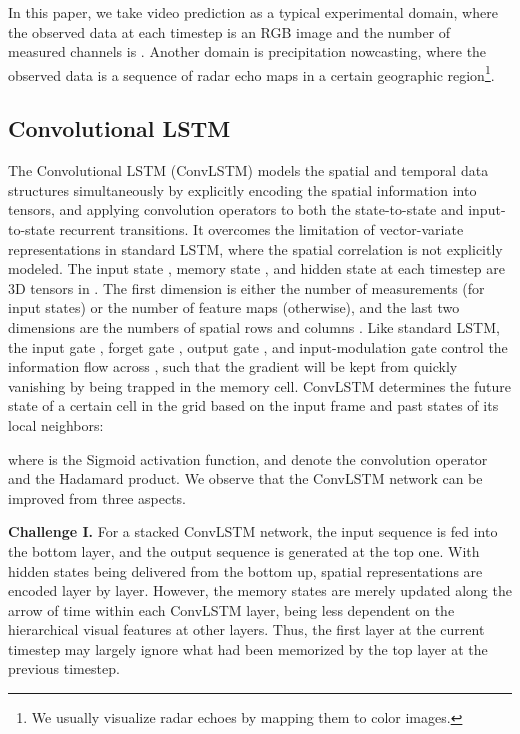 \documentclass[10pt,journal,compsoc]{IEEEtran}
\newcommand{\myparagraph}[1]{\vspace{5pt} \noindent \textbf{#1.}}
\begin{document}
In this paper, we take video prediction as a typical experimental domain, where the observed data at each timestep is an RGB image and the number of measured channels is .
Another domain is precipitation nowcasting, where the observed data is a sequence of radar echo maps in a certain geographic region\footnote{
We usually visualize radar echoes by mapping them to color images.}. 

\subsection{Convolutional LSTM}

The Convolutional LSTM (ConvLSTM) \cite{shi2015convolutional} models the spatial and temporal data structures simultaneously by explicitly encoding the spatial information into tensors, and applying convolution operators to both the state-to-state and input-to-state recurrent transitions.
It overcomes the limitation of vector-variate representations in standard LSTM, where the spatial correlation is not explicitly modeled. 
The input state , memory state , and hidden state  at each timestep are 3D tensors in . The first dimension is either the number of measurements (for input states) or the number of feature maps (otherwise), and the last two dimensions are the numbers of spatial rows  and columns . 
Like standard LSTM, the input gate , forget gate , output gate , and input-modulation gate  control the information flow across , such that the gradient will be kept from quickly vanishing by being trapped in the memory cell.
ConvLSTM determines the future state of a certain cell in the  grid based on the input frame and past states of its local neighbors:

where  is the Sigmoid activation function,  and  denote the convolution operator and the Hadamard product. 
We observe that the ConvLSTM network can be improved from three aspects.

\myparagraph{Challenge I}
For a stacked ConvLSTM network, the input sequence  is fed into the bottom layer, and the output sequence  is generated at the top one. With hidden states  being delivered from the bottom up, spatial representations are encoded layer by layer. However, the memory states  are merely updated along the arrow of time within each ConvLSTM layer, being less dependent on the hierarchical visual features at other layers.
Thus, the first layer at the current timestep may largely ignore what had been memorized by the top layer at the previous timestep. 
\end{document}
